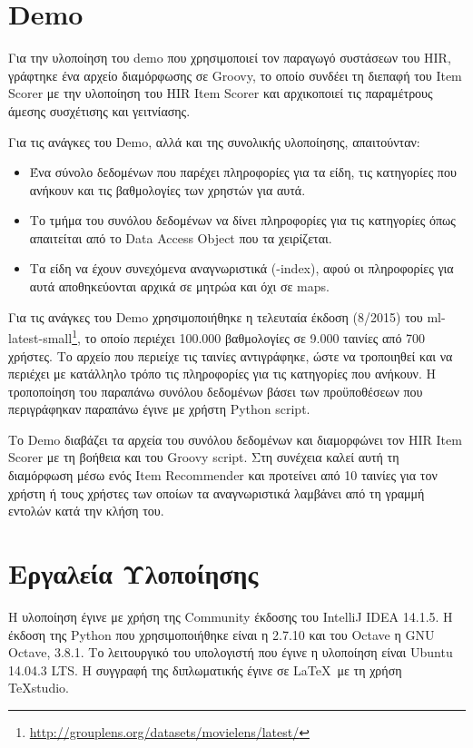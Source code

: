 \section{ \en Demo}
Για την υλοποίηση του {\en demo} που χρησιμοποιεί τον παραγωγό συστάσεων του {\en HIR}, γράφτηκε ένα αρχείο διαμόρφωσης σε {\en Groovy}, το οποίο συνδέει τη διεπαφή του {\en Item Scorer} με την υλοποίηση του {\en HIR Item Scorer} και αρχικοποιεί τις παραμέτρους άμεσης συσχέτισης και γειτνίασης. \par
Για τις ανάγκες του {\en Demo}, αλλά και της συνολικής υλοποίησης, απαιτούνταν:
\begin{itemize}
\item Ένα σύνολο δεδομένων που παρέχει πληροφορίες για τα είδη, τις κατηγορίες που ανήκουν και τις βαθμολογίες των χρηστών για αυτά.
\item Το τμήμα του συνόλου δεδομένων να δίνει πληροφορίες για τις κατηγορίες όπως απαιτείται από το {\en Data Access Object} που τα χειρίζεται.
\item Τα είδη να έχουν συνεχόμενα αναγνωριστικά ({-index}), αφού οι πληροφορίες για αυτά αποθηκεύονται αρχικά σε μητρώα και όχι σε {\en maps}.
\end{itemize}\par
Για τις ανάγκες του {\en Demo} χρησιμοποιήθηκε η τελευταία έκδοση (8/2015) του {\en ml-latest-small}\footnote{\en \url{http://grouplens.org/datasets/movielens/latest/}}, το οποίο περιέχει 100.000 βαθμολογίες σε 9.000 ταινίες από 700 χρήστες. Το αρχείο που περιείχε τις ταινίες αντιγράφηκε, ώστε να τροποιηθεί και να περιέχει με κατάλληλο τρόπο τις πληροφορίες για τις κατηγορίες που ανήκουν. Η τροποποίηση του παραπάνω συνόλου δεδομένων βάσει των προϋποθέσεων που περιγράφηκαν παραπάνω έγινε με χρήστη {\en Python script}.\par
Το {\en Demo} διαβάζει τα αρχεία του συνόλου δεδομένων και διαμορφώνει τον {\en HIR Item Scorer} με τη βοήθεια και του {\en Groovy script}. Στη συνέχεια καλεί αυτή τη διαμόρφωση μέσω ενός {\en Item Recommender} και προτείνει από 10 ταινίες για τον χρήστη ή τους χρήστες των οποίων τα αναγνωριστικά λαμβάνει από τη γραμμή εντολών κατά την κλήση του. 
\section{Εργαλεία Υλοποίησης}
Η υλοποίηση έγινε με χρήση της {\en Community} έκδοσης του {\en IntelliJ IDEA 14.1.5}. Η έκδοση της {\en Python} που χρησιμοποιήθηκε είναι η 2.7.10 και του {\en Octave} η {\en GNU Octave, 3.8.1}. Το λειτουργικό του υπολογιστή που έγινε η υλοποίηση είναι {\en Ubuntu 14.04.3 LTS}. Η συγγραφή της διπλωματικής έγινε σε \LaTeX\ με τη χρήση {\en TeXstudio}.